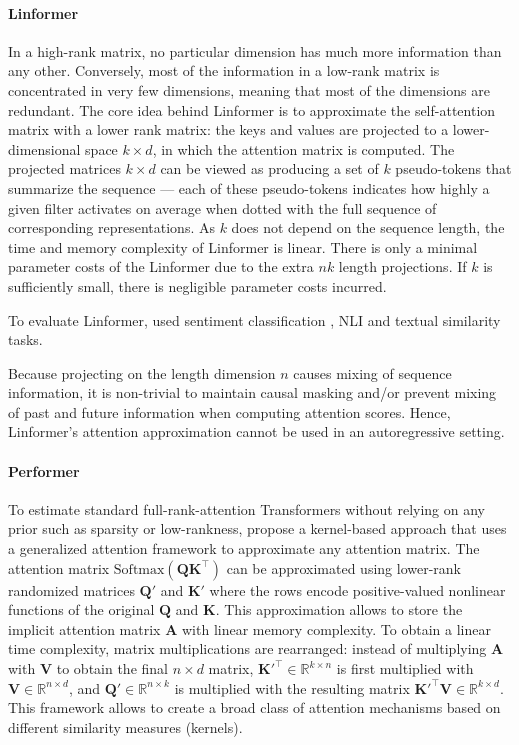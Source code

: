 \paragraph{Linformer} In a high-rank matrix, no particular dimension has much more information than any other. Conversely, most of the information in a low-rank matrix is concentrated in very few dimensions, meaning that most of the dimensions are redundant. The core idea behind Linformer \citep{wang2020linformer} is to approximate the self-attention matrix with a lower rank matrix: the keys and values are projected to a lower-dimensional space $k \times d$, in which the attention matrix is computed. The projected matrices $k \times d$ can be viewed as producing a set of $k$ pseudo-tokens that summarize the sequence — each of these pseudo-tokens indicates how highly a given filter activates on average when dotted with the full sequence of corresponding representations. As $k$ does not depend on the sequence length, the time and memory complexity of Linformer is linear. There is only a minimal parameter costs of the Linformer due to the extra $nk$ length projections. If $k$ is sufficiently small, there is negligible parameter costs incurred. 

To evaluate Linformer, \citet{wang2020linformer} used sentiment classification \citep{maas2011learning, socher2013recursive}, \ac{NLI} \citep{wang2018glue} and textual similarity \citep{wang2017bilateral} tasks. 

Because projecting on the length dimension $n$ causes mixing of sequence information, it is non-trivial to maintain causal masking and/or prevent mixing of past and future information when computing attention scores. Hence, Linformer's attention approximation cannot be used in an autoregressive setting.


\paragraph{Performer} To estimate standard full-rank-attention Transformers without relying on any prior such as sparsity or low-rankness, \citet{choromanski2020rethinking} propose a kernel-based approach that uses a generalized attention framework to approximate any attention matrix. The attention matrix $\text{Softmax}(\bm{Q}\bm{K}^{\top})$ can be approximated using lower-rank randomized matrices $\bm{Q'}$ and $\bm{K'}$ where the rows encode positive-valued nonlinear functions of the original $\bm{Q}$ and $\bm{K}$. This approximation allows to store the implicit attention matrix $\bm{A}$ with
linear memory complexity. To obtain a linear time complexity, matrix multiplications are rearranged: instead of multiplying $\bm{A}$ with $\bm{V}$ to obtain the final $n \times d$ matrix, $\bm{K'}^{\top} \in \mathbb{R}^{k \times n}$ is first multiplied with $\bm{V} \in \mathbb{R}^{n \times d}$, and $\bm{Q'} \in \mathbb{R}^{n \times k}$ is multiplied with the resulting matrix $\bm{K'}^{\top} \bm{V} \in \mathbb{R}^{k \times d}$. This framework allows to create a broad class of attention mechanisms based on different similarity measures (kernels). 

